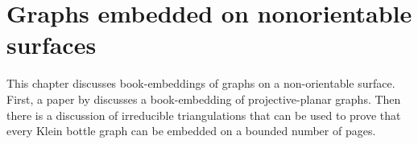 \chapter{Graphs embedded on nonorientable surfaces}\label{chap:nonorientable}

This chapter discusses book-embeddings of graphs on a non-orientable surface. First, a paper by \textcite{nakamotoBookEmbeddingProjectiveplanar2015} discusses a book-embedding of projective-planar graphs. Then there is a discussion of irreducible triangulations that can be used to prove that every Klein bottle graph can be embedded on a bounded number of pages. 



%



